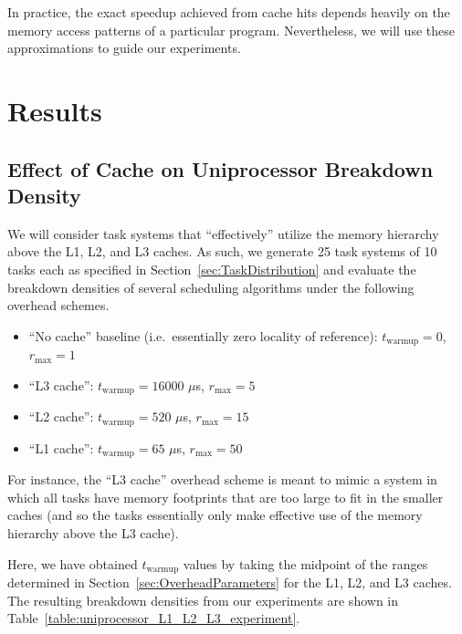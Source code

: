 \documentclass[11pt]{article}
\newcommand{\secref}[1]{Section~\ref{#1}}
\newcommand{\tabref}[1]{Table~\ref{#1}}
\begin{document}
In practice, the exact speedup achieved from cache hits depends heavily on the memory access patterns of a particular program. Nevertheless, we will use these approximations to guide our experiments.

\section{Results}\label{sec:Results}

\subsection{Effect of Cache on Uniprocessor Breakdown Density}\label{sec:uniprocessor_breakdown_density_experiments}

We will consider task systems that ``effectively'' utilize the memory hierarchy above the L1, L2, and L3 caches. As such, we generate 25 task systems of 10 tasks each as specified in \secref{sec:TaskDistribution} and evaluate the breakdown densities of several scheduling algorithms under the following overhead schemes.

\begin{itemize}\itemsep0em
	\item ``No cache'' baseline (i.e.\ essentially zero locality of reference): $t_\text{warmup} = 0$, $r_\text{max} = 1$
	\item ``L3 cache'': $t_\text{warmup} = 16000$ $\mu$s, $r_\text{max} = 5$
	\item ``L2 cache'': $t_\text{warmup} = 520$ $\mu$s, $r_\text{max} = 15$
	\item ``L1 cache'': $t_\text{warmup} = 65$ $\mu$s, $r_\text{max} = 50$
\end{itemize}

For instance, the ``L3 cache'' overhead scheme is meant to mimic a system in which all tasks have memory footprints that are too large to fit in the smaller caches (and so the tasks essentially only make effective use of the memory hierarchy above the L3 cache).

Here, we have obtained $t_\text{warmup}$ values by taking the midpoint of the ranges determined in \secref{sec:OverheadParameters} for the L1, L2, and L3 caches. The resulting breakdown densities from our experiments are shown in \tabref{table:uniprocessor_L1_L2_L3_experiment}.
\end{document}
